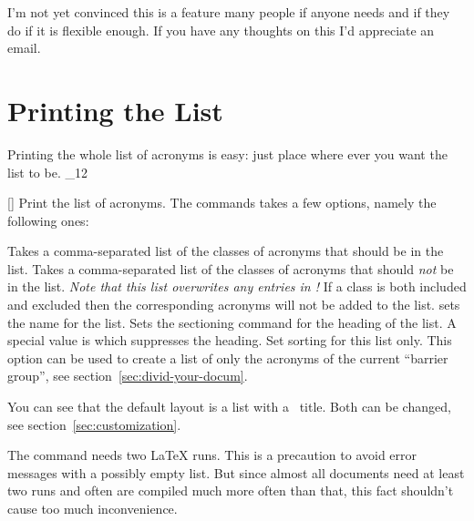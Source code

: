 \documentclass[load-preamble+]{cnltx-doc}
\makeatletter
\renewenvironment{commands}
  {%
    \cnltx@set@catcode_{12}%
    \let\command\cnltx@command
    \cnltxlist
  }
  {\endcnltxlist}
\makeatother
\begin{document}
I'm not yet convinced this is a feature many people if anyone needs and if
they do if it is flexible enough.  If you have any thoughts on this I'd
appreciate an email.

\section{Printing the List}\label{sec:print_lists}
Printing the whole list of acronyms is easy: just place 
where ever you want the list to be.
\begin{commands}
  \command{printacronyms}[]
    Print the list of acronyms.
\end{commands}
The commands takes a few options, namely the following ones:
\begin{options}
    Takes a comma-separated list of the classes of acronyms that should be in
    the list.
    Takes a comma-separated list of the classes of acronyms that should
    \emph{not} be in the list.  \emph{Note that this list overwrites any
      entries in !} If a class is both included and
    excluded then the corresponding acronyms will not be added to the list.
    sets the name for the list.
    Sets the sectioning command for the heading of the list.  A special value
    is  which suppresses the heading. 
    Set sorting for this list only.
    This option can be used to create a list of only the
    acronyms of the current \enquote{barrier group}, see
    section~\ref{sec:divid-your-docum}.
\end{options}
\begin{example}
  \printacronyms[exclude-classes=city]
 
  \printacronyms[include-classes=city,name={City Acronyms}]
\end{example}

You can see that the default layout is a  list with a
\sarg\ title.  Both can be changed, see
section~\vref{sec:customization}.

The command  needs two \LaTeX{} runs.  This is a precaution
to avoid error messages with a possibly empty list.  But since almost all
documents need at least two runs and often are compiled much more often than
that, this fact shouldn't cause too much inconvenience.
\end{document}
